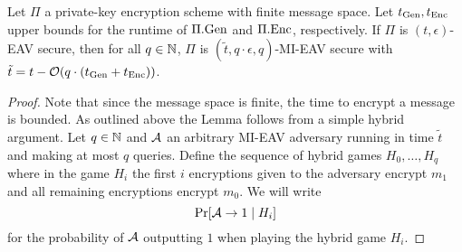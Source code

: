 \begin{lemma} \label{lemma:mi-eav-from-eav}
	Let $\Pi$ a private-key encryption scheme with finite message space. Let $t_{\mathrm{Gen}}, t_{\mathrm{Enc}}$ upper bounds for the runtime of $\Pi.\mathrm{Gen}$ and $\Pi.\mathrm{Enc}$, respectively. If $\Pi$ is $(t, \epsilon)$-EAV secure, then for all $q \in \mathbb{N}$, $\Pi$ is $(\tilde{t}, q \cdot \epsilon, q)$-MI-EAV secure with $\tilde{t} = t - \mathcal{O}(q \cdot (t_{\mathrm{Gen}} + t_{\mathrm{Enc}}))$.
\end{lemma}
\begin{proof} Note that since the message space is finite, the time to encrypt a message is bounded. As outlined above the Lemma follows from a simple hybrid argument. Let $q \in \mathbb{N}$ and $\mathcal{A}$ an arbitrary MI-EAV adversary running in time $\tilde{t}$ and making at most $q$ queries. Define the sequence of hybrid games $H_0, \ldots, H_q$ where in the game $H_i$ the first $i$ encryptions given to the adversary encrypt $m_1$ and all remaining encryptions encrypt $m_0$. We will write
	\[
		\pr{\adv \rightarrow 1 \mid H_i}
	\]
	for the probability of $\mathcal{A}$ outputting $1$ when playing the hybrid game $H_i$.


\end{proof}
